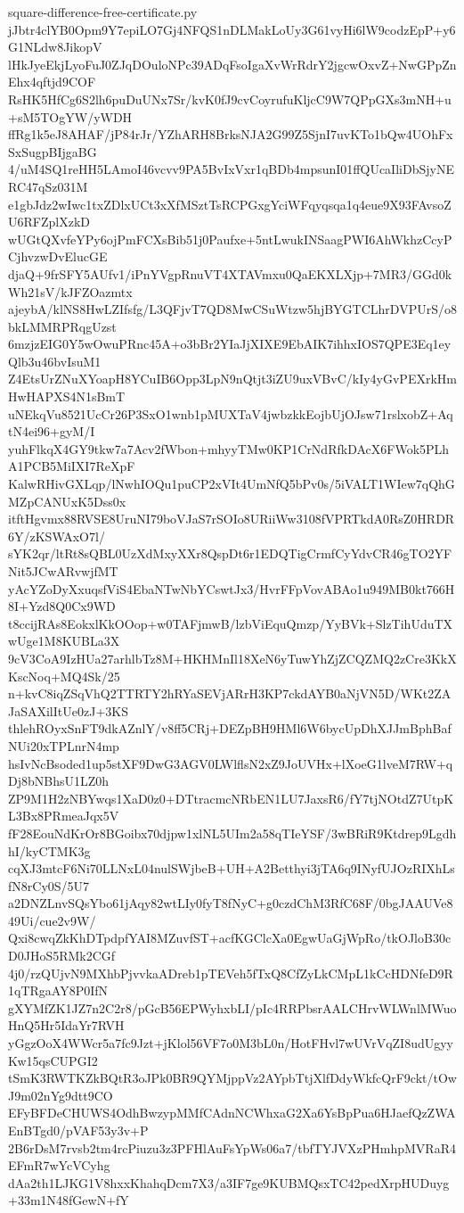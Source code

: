 \documentclass[11pt]{article}
\theoremstyle{definition}
\theoremstyle{remark}
\begin{document}
\begin{filecontents*}[overwrite]{square-difference-free-certificate.py}
jJbtr4clYB0Opm9Y7epiLO7Gj4NFQS1nDLMakLoUy3G61vyHi6lW9codzEpP+y6G1NLdw8JikopV
lHkJyeEkjLyoFuJ0ZJqDOuloNPc39ADqFsoIgaXvWrRdrY2jgcwOxvZ+NwGPpZnEhx4qftjd9COF
RsHK5HfCg6S2lh6puDuUNx7Sr/kvK0fJ9cvCoyrufuKljcC9W7QPpGXs3mNH+u+sM5TOgYW/yWDH
ffRg1k5eJ8AHAF/jP84rJr/YZhARH8BrksNJA2G99Z5SjnI7uvKTo1bQw4UOhFxSxSugpBIjgaBG
4/uM4SQ1reHH5LAmoI46vcvv9PA5BvIxVxr1qBDb4mpsunI01ffQUcaIliDbSjyNERC47qSz031M
e1gbJdz2wIwc1txZDlxUCt3xXfMSztTsRCPGxgYciWFqyqsqa1q4eue9X93FAvsoZU6RFZplXzkD
wUGtQXvfeYPy6ojPmFCXsBib51j0Paufxe+5ntLwukINSaagPWI6AhWkhzCcyPCjhvzwDvElucGE
djaQ+9frSFY5AUfv1/iPnYVgpRnuVT4XTAVmxu0QaEKXLXjp+7MR3/GGd0kWh21sV/kJFZOazmtx
ajeybA/klNS8HwLZIfsfg/L3QFjvT7QD8MwCSuWtzw5hjBYGTCLhrDVPUrS/o8bkLMMRPRqgUzst
6mzjzEIG0Y5wOwuPRnc45A+o3bBr2YIaJjXIXE9EbAIK7ihhxIOS7QPE3Eq1eyQlb3u46bvIsuM1
Z4EtsUrZNuXYoapH8YCuIB6Opp3LpN9nQtjt3iZU9uxVBvC/kIy4yGvPEXrkHmHwHAPXS4N1sBmT
uNEkqVu8521UcCr26P3SxO1wnb1pMUXTaV4jwbzkkEojbUjOJsw71rslxobZ+AqtN4ei96+gyM/I
yuhFlkqX4GY9tkw7a7Acv2fWbon+mhyyTMw0KP1CrNdRfkDAcX6FWok5PLhA1PCB5MiIXI7ReXpF
KalwRHivGXLqp/lNwhIOQu1puCP2xVIt4UmNfQ5bPv0s/5iVALT1WIew7qQhGMZpCANUxK5Dss0x
itftHgvmx88RVSE8UruNI79boVJaS7rSOIo8URiiWw3108fVPRTkdA0RsZ0HRDR6Y/zKSWAxO7l/
sYK2qr/ltRt8sQBL0UzXdMxyXXr8QspDt6r1EDQTigCrmfCyYdvCR46gTO2YFNit5JCwARvwjfMT
yAcYZoDyXxuqsfViS4EbaNTwNbYCswtJx3/HvrFFpVovABAo1u949MB0kt766H8I+Yzd8Q0Cx9WD
t8ccijRAs8EokxlKkOOop+w0TAFjmwB/lzbViEquQmzp/YyBVk+SlzTihUduTXwUge1M8KUBLa3X
9cV3CoA9IzHUa27arhlbTz8M+HKHMnIl18XeN6yTuwYhZjZCQZMQ2zCre3KkXKscNoq+MQ4Sk/25
n+kvC8iqZSqVhQ2TTRTY2hRYaSEVjARrH3KP7ckdAYB0aNjVN5D/WKt2ZAJaSAXilItUe0zJ+3KS
thlehROyxSnFT9dkAZnlY/v8ff5CRj+DEZpBH9HMl6W6bycUpDhXJJmBphBafNUi20xTPLnrN4mp
hsIvNcBsoded1up5stXF9DwG3AGV0LWlflsN2xZ9JoUVHx+lXoeG1lveM7RW+qDj8bNBhsU1LZ0h
ZP9M1H2zNBYwqs1XaD0z0+DTtracmcNRbEN1LU7JaxsR6/fY7tjNOtdZ7UtpKL3Bx8PRmeaJqx5V
fF28EouNdKrOr8BGoibx70djpw1xlNL5UIm2a58qTIeYSF/3wBRiR9Ktdrep9LgdhhI/kyCTMK3g
cqXJ3mtcF6Ni70LLNxL04nulSWjbeB+UH+A2Betthyi3jTA6q9INyfUJOzRIXhLsfN8rCy0S/5U7
a2DNZLnvSQsYbo61jAqy82wtLIy0fyT8fNyC+g0czdChM3RfC68F/0bgJAAUVe849Ui/cue2v9W/
Qxi8cwqZkKhDTpdpfYAI8MZuvfST+acfKGClcXa0EgwUaGjWpRo/tkOJloB30cD0JHoS5RMk2CGf
4j0/rzQUjvN9MXhbPjvvkaADreb1pTEVeh5fTxQ8CfZyLkCMpL1kCcHDNfeD9R1qTRgaAY8P0IfN
gXYMfZK1JZ7n2C2r8/pGcB56EPWyhxbLI/pIc4RRPbsrAALCHrvWLWnlMWuoHnQ5Hr5IdaYr7RVH
yGgzOoX4WWcr5a7fc9Jzt+jKlol56VF7o0M3bL0n/HotFHvl7wUVrVqZI8udUgyyKw15qsCUPGI2
tSmK3RWTKZkBQtR3oJPk0BR9QYMjppVz2AYpbTtjXlfDdyWkfcQrF9ckt/tOwJ9m02nYg9dtt9CO
EFyBFDeCHUWS4OdhBwzypMMfCAdnNCWhxaG2Xa6YsBpPua6HJaefQzZWAEnBTgd0/pVAF53y3v+P
2B6rDsM7rvsb2tm4rcPiuzu3z3PFHlAuFsYpWs06a7/tbfTYJVXzPHmhpMVRaR4EFmR7wYcVCyhg
dAa2th1LJKG1V8hxxKhahqDcm7X3/a3IF7ge9KUBMQsxTC42pedXrpHUDuyg+33m1N48fGewN+fY

\end{filecontents*}
\end{document}
